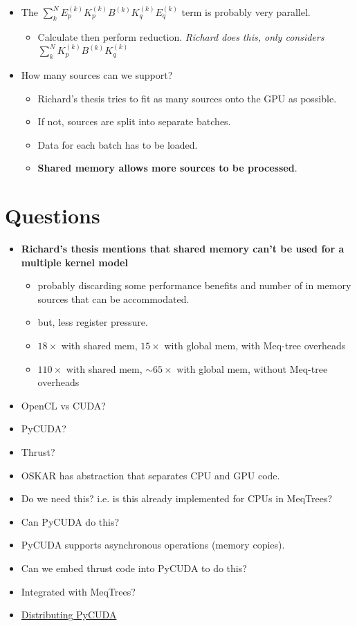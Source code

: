 \documentclass[]{article}
\begin{document}
\begin{itemize}
\item The $\sum_k^N E_p^{(k)} K_p^{(k)} B^{(k)} K_q^{(k)} E_q^{(k)}$ term is probably very parallel.
\begin{itemize}
\item Calculate then perform reduction. {\it Richard does this, only considers $\sum_k^N K_p^{(k)} B^{(k)} K_q^{(k)}$}
\end{itemize}
\item How many sources can we support?
\begin{itemize}
\item Richard's thesis tries to fit as many sources onto the GPU as possible.
\item If not, sources are split into separate batches.
\item Data for each batch has to be loaded.
\item {\bf Shared memory allows more sources to be processed}.
\end{itemize}
\end{itemize}

\section{Questions}

\begin{itemize}
\item {\bf Richard's thesis mentions that shared memory can't be used for a multiple kernel model}
\begin{itemize}
\item probably discarding some performance benefits and number of in memory sources that can be accommodated.
\item but, less register pressure.
\item $18 \times$ with shared mem, $15 \times$ with global mem, with Meq-tree overheads
\item $110 \times$ with shared mem, $\sim 65 \times$ with global mem, without Meq-tree overheads
\end{itemize}
\item OpenCL vs CUDA?
\item PyCUDA?
\item Thrust?
\item OSKAR has abstraction that separates CPU and GPU code.
\item Do we need this? i.e. is this already implemented for CPUs in MeqTrees?
\item Can PyCUDA do this?
\item PyCUDA supports asynchronous operations (memory copies).
\item Can we embed thrust code into PyCUDA to do this?
\item Integrated with MeqTrees?
\item \href{http://lists.tiker.net/pipermail/pycuda/2013-April/004294.html}{Distributing PyCUDA}
\end{itemize}



\end{document}

